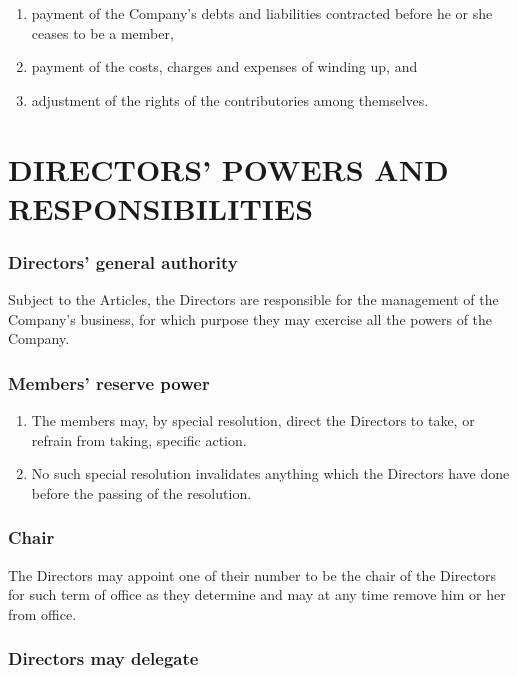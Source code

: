 \documentclass[a4paper,12pt]{article}
\begin{document}
\begin{enumerate}
  \item payment of the Company’s debts and liabilities contracted before he or she ceases to be a member,
  \item payment of the costs, charges and expenses of winding up, and
  \item adjustment of the rights of the contributories among themselves.
\end{enumerate}

\part*{DIRECTORS' POWERS AND RESPONSIBILITIES}

\section{Directors' general authority}

Subject to the Articles, the Directors are responsible for the management of the Company’s business, for which purpose they may exercise all the powers of the Company.

\section{Members’ reserve power}

\begin{enumerate}
  \item The members may, by special resolution, direct the Directors to take, or refrain from taking, specific action.
  \item No such special resolution invalidates anything which the Directors have done before the passing of the resolution.
\end{enumerate}

\section{Chair}

The Directors may appoint one of their number to be the chair of the Directors for such term of office as they determine and may at any time remove him or her from office.

\section{Directors may delegate}
\end{document}
